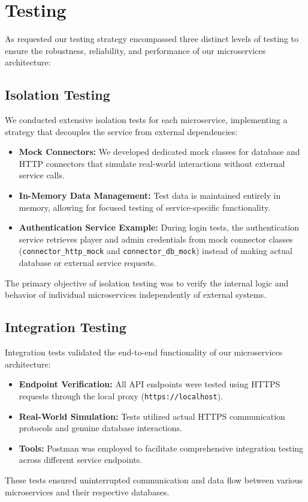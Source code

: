 \documentclass{article}
\begin{document}
\newpage

\section{Testing} \label{sec:testing_approach}
As requested our testing strategy encompassed three distinct levels of testing to ensure the robustness, reliability, and performance of our microservices architecture:

\subsection{Isolation Testing}
We conducted extensive isolation tests for each microservice, implementing a strategy that decouples the service from external dependencies:
\begin{itemize}
    \item \textbf{Mock Connectors:} We developed dedicated mock classes for database and HTTP connectors that simulate real-world interactions without external service calls.
    \item \textbf{In-Memory Data Management:} Test data is maintained entirely in memory, allowing for focused testing of service-specific functionality.
    \item \textbf{Authentication Service Example:} During login tests, the authentication service retrieves player and admin credentials from mock connector classes (\texttt{connector\_http\_mock} and \texttt{connector\_db\_mock}) instead of making actual database or external service requests.
\end{itemize}

The primary objective of isolation testing was to verify the internal logic and behavior of individual microservices independently of external systems.

\subsection{Integration Testing}
Integration tests validated the end-to-end functionality of our microservices architecture:
\begin{itemize}
    \item \textbf{Endpoint Verification:} All API endpoints were tested using HTTPS requests through the local proxy (\texttt{https://localhost}).
    \item \textbf{Real-World Simulation:} Tests utilized actual HTTPS communication protocols and genuine database interactions.
    \item \textbf{Tools:} Postman was employed to facilitate comprehensive integration testing across different service endpoints.
\end{itemize}
These tests ensured uninterrupted communication and data flow between various microservices and their respective databases.
\end{document}
